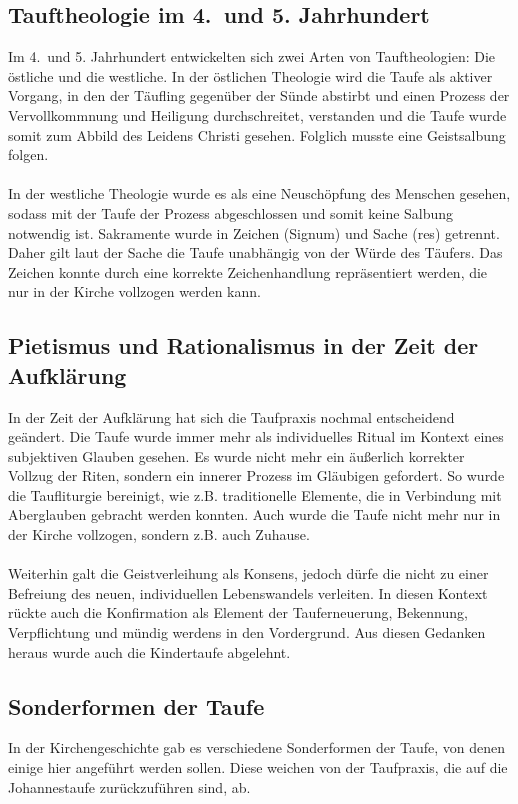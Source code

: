 \subsection{Tauftheologie im 4.\ und 5. Jahrhundert}
Im 4.\ und 5. Jahrhundert entwickelten sich zwei Arten von Tauftheologien: Die östliche und die westliche. In der östlichen Theologie wird die Taufe als aktiver Vorgang, in den der Täufling gegenüber der Sünde abstirbt und einen Prozess der Vervollkommnung und Heiligung durchschreitet, verstanden und die Taufe wurde somit zum Abbild des Leidens Christi gesehen. Folglich musste eine Geistsalbung folgen.
\\~\\
In der westliche Theologie wurde es als eine Neuschöpfung des Menschen gesehen, sodass mit der Taufe der Prozess abgeschlossen und somit keine Salbung notwendig ist. Sakramente wurde in Zeichen (Signum) und Sache (res) getrennt. Daher gilt laut der Sache die Taufe unabhängig von der Würde des Täufers. Das Zeichen konnte durch eine korrekte Zeichenhandlung repräsentiert werden, die nur in der Kirche vollzogen werden kann.

\subsection{Pietismus und Rationalismus in der Zeit der Aufklärung}
In der Zeit der Aufklärung hat sich die Taufpraxis nochmal entscheidend geändert. Die Taufe wurde immer mehr als individuelles Ritual im Kontext eines subjektiven Glauben gesehen. Es wurde nicht mehr ein äußerlich korrekter Vollzug der Riten, sondern ein innerer Prozess im Gläubigen  gefordert. So wurde die Taufliturgie bereinigt, wie z.B. traditionelle Elemente, die in Verbindung mit Aberglauben gebracht werden konnten. Auch wurde die Taufe nicht mehr nur in der Kirche vollzogen, sondern z.B. auch Zuhause.
\\~\\
Weiterhin galt die Geistverleihung als Konsens, jedoch dürfe die nicht zu einer Befreiung des neuen, individuellen Lebenswandels verleiten. In diesen Kontext rückte auch die Konfirmation als Element der Tauferneuerung, Bekennung, Verpflichtung und mündig werdens in den Vordergrund. Aus diesen Gedanken heraus wurde auch die Kindertaufe abgelehnt.

\subsection{Sonderformen der Taufe}
In der Kirchengeschichte gab es verschiedene Sonderformen der Taufe, von denen einige hier angeführt werden sollen. Diese weichen von der Taufpraxis, die auf die Johannestaufe zurückzuführen sind, ab.

